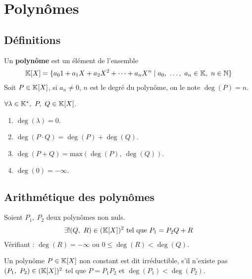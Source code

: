 \chapter{Polynômes}
\def\arraystretch{1}

\section{Définitions}
\begin{definition}[Polynôme]
    Un \textbf{polynôme} est un élément de l'ensemble 
    \begin{align*}
        \K[X] = \{ a_0 1 + a_1 X + a_2 X^2 + \cdots + a_n X^n \mid a_0,\ \ldots,\ a_n \in \K,\ n \in \N \}
    \end{align*}
    Soit $P \in \mathbb{K}[X]$, si $a_n \neq 0$, $n$ est le degré du polynôme, on le note 
    $ \deg(P) = n. $
\end{definition}

\begin{proposition}
	$\forall \lambda \in \mathbb{K}^*,\ P,\ Q \in \mathbb{K}[X]$. 
	\begin{enumerate}
    		\item $\operatorname{deg}(\lambda) = 0$.
    		\item $\operatorname{deg}(P \cdot Q) = \operatorname{deg}(P) + \operatorname{deg}(Q)$.
    		\item $\operatorname{deg}(P + Q) = \mathrm{max}\left(\operatorname{deg}(P),\ \operatorname{deg}(Q)\right)$.
            \item $\operatorname{deg}(0) = -\infty$.
    	\end{enumerate}
\end{proposition}

\section{Arithmétique des polynômes}

\begin{theorem}
	Soient $P_1,\ P_2$ deux polynômes non nuls.
	\begin{align*}
		\exists ! (Q,\ R) \in (\mathbb{K}[X])^2 \text{ tel que } P_1 = P_2 Q + R 
	\end{align*}
	Vérifiant :
	$\operatorname{deg}(R) = -\infty$ ou $0 \leq \operatorname{deg}(R) < \operatorname{deg}(Q)$.
\end{theorem}

\begin{definition}
	Un polynôme $P \in \mathbb{K}[X]$ non constant est dit irréductible, s'il n'existe pas $(P_1,\ P_2) \in (\mathbb{K}[X])^2$ tel que $P = P_1 P_2$ et $\operatorname{deg}(P_1) < \operatorname{deg}(P_2)$.
\end{definition}

